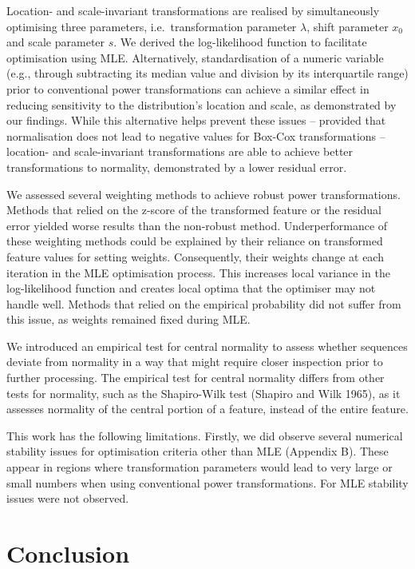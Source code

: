 \documentclass[
  a4paper,
]{article}
\begin{document}
Location- and scale-invariant transformations are realised by
simultaneously optimising three parameters, i.e.~transformation
parameter \(\lambda\), shift parameter \(x_0\) and scale parameter
\(s\). We derived the log-likelihood function to facilitate optimisation
using MLE. Alternatively, standardisation of a numeric variable (e.g.,
through subtracting its median value and division by its interquartile
range) prior to conventional power transformations can achieve a similar
effect in reducing sensitivity to the distribution's location and scale,
as demonstrated by our findings. While this alternative helps prevent
these issues -- provided that normalisation does not lead to negative
values for Box-Cox transformations -- location- and scale-invariant
transformations are able to achieve better transformations to normality,
demonstrated by a lower residual error.

We assessed several weighting methods to achieve robust power
transformations. Methods that relied on the z-score of the transformed
feature or the residual error yielded worse results than the non-robust
method. Underperformance of these weighting methods could be explained
by their reliance on transformed feature values for setting weights.
Consequently, their weights change at each iteration in the MLE
optimisation process. This increases local variance in the
log-likelihood function and creates local optima that the optimiser may
not handle well. Methods that relied on the empirical probability did
not suffer from this issue, as weights remained fixed during MLE.

We introduced an empirical test for central normality to assess whether
sequences deviate from normality in a way that might require closer
inspection prior to further processing. The empirical test for central
normality differs from other tests for normality, such as the
Shapiro-Wilk test (Shapiro and Wilk 1965), as it assesses normality of
the central portion of a feature, instead of the entire feature.

This work has the following limitations. Firstly, we did observe several
numerical stability issues for optimisation criteria other than MLE
(Appendix B). These appear in regions where transformation parameters
would lead to very large or small numbers when using conventional power
transformations. For MLE stability issues were not observed.

\section{Conclusion}\label{conclusion}
\end{document}
